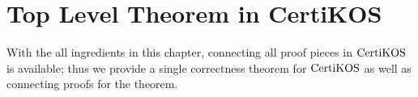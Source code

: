 \section{Top Level Theorem in CertiKOS}
\label{chapter:certikos:sec:top-level-theorem}

With the all ingredients in this chapter, 
connecting all proof pieces in $\mathrm{CertiKOS}$ is available;
thus we provide a single correctness theorem for $\mathrm{CertiKOS}$
as well as connecting proofs
for the theorem.


